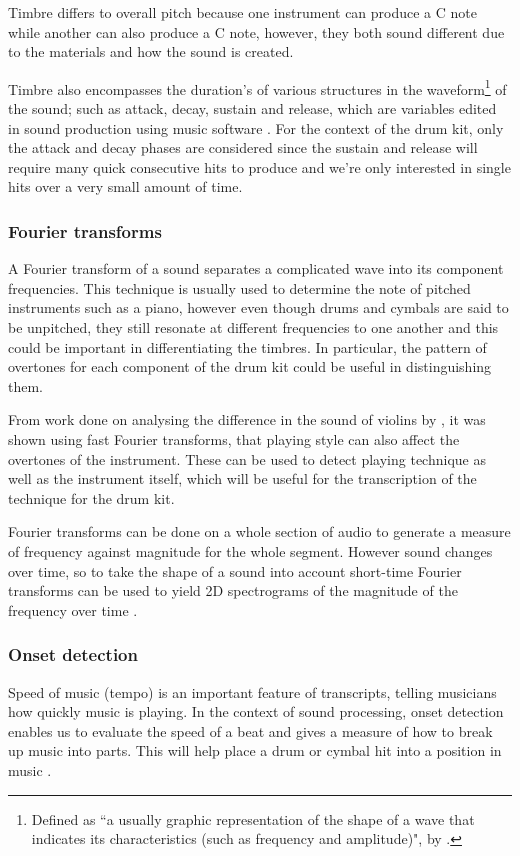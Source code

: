 \documentclass[12pt]{article}
\begin{document}
	Timbre differs to overall pitch because one instrument can produce a C note while another can also produce a C note, however, they both sound different due to the materials and how the sound is created.\medskip
	
	Timbre also encompasses the duration's of various structures in the waveform\footnote{Defined as ``a usually graphic representation of the shape of a wave that indicates its characteristics (such as frequency and amplitude)", by \textcite{merriam-webster}.} of the sound; such as attack, decay, sustain and release, which are variables edited in sound production using music software \parencite[p.26-29]{Muller}. For the context of the drum kit, only the attack and decay phases are considered since the sustain and release will require many quick consecutive hits to produce and we're only interested in single hits over a very small amount of time.\medskip
	
	\subsubsection{Fourier transforms}
	\label{sec:fourier_transforms}
	A Fourier transform of a sound separates a complicated wave into its component frequencies. This technique is usually used to determine the note of pitched instruments such as a piano, however even though drums and cymbals are said to be unpitched, they still resonate at different frequencies to one another and this could be important in differentiating the timbres. In particular, the pattern of overtones for each component of the drum kit could be useful in distinguishing them.\medskip
	
	From work done on analysing the difference in the sound of violins by \textcite{Yokoyama2016}, it was shown using fast Fourier transforms, that playing style can also affect the overtones of the instrument. These can be used to detect playing technique as well as the instrument itself, which will be useful for the transcription of the technique for the drum kit.\medskip
	
	Fourier transforms can be done on a whole section of audio to generate a measure of frequency against magnitude for the whole segment. However sound changes over time, so to take the shape of a sound into account short-time Fourier transforms can be used to yield 2D spectrograms of the magnitude of the frequency over time \parencite[p.53]{Muller}.
	
	\subsubsection{Onset detection}
	\label{sec:onset_detection}
	Speed of music (tempo) is an important feature of transcripts, telling musicians how quickly music is playing. In the context of sound processing, onset detection enables us to evaluate the speed of a beat and gives a measure of how to break up music into parts. This will help place a drum or cymbal hit into a position in music \parencite[p.304]{Muller}.\medskip
	
\end{document}
